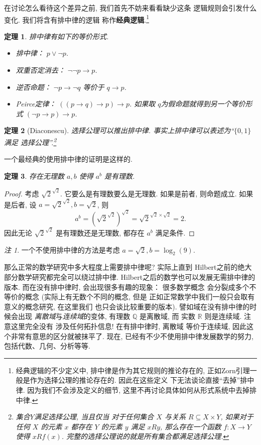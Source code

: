 \documentclass[UTF8]{ctexbook}
\theoremstyle{plain}
\newtheorem{theorem}{定理}[chapter]
\theoremstyle{definition}
\theoremstyle{remark}
\newtheorem*{remark}{注}
\begin{document}
在讨论怎么看待这个差异之前, 我们首先不妨来看看缺少这条
逻辑规则会引发什么变化. 我们将含有排中律的逻辑
称作\textbf{经典逻辑}.\footnote{经典逻辑的不少定义中,
排中律是作为其它规则的推论存在的,
正如Zorn引理一般是作为选择公理的推论存在的. 因此在这些定义
下无法谈论直接“去掉”排中律. 因为我们不会涉及定义的细节,
这里不再讨论具体如何从形式系统中去掉排中律.}
\begin{theorem}
排中律有如下的等价形式.
\begin{itemize}
\item 排中律： \(p \vee \neg p\).
\item 双重否定消去： \(\neg\neg p \to p\).
\item 逆否命题： \(\neg p \to \neg q\) 等价于 \(q \to p\).
\item Peirce定律： \(((p \to q) \to p) \to p\). 如果取 \(q\)为假命题就得到另一个等价形式 \((\neg p\to p) \to p\).
\end{itemize}
\end{theorem}
\begin{theorem}[Diaconescu]
选择公理可以推出排中律.
事实上排中律可以表述为“\(\{0,1\}\)满足
选择公理”.\footnote{集合\(Y\)满足选择公理, 当且仅当
对于任何集合 \(X\) 与关系 \(R \subseteq X \times Y\), 如果对于
任何 \(X\) 的元素 \(x\) 都存在 \(Y\) 的元素 \(y\)
满足 \(xRy\), 那么存在一个函数 \(f : X \to Y\) 使得
\(xRf(x)\). 完整的选择公理说的就是所有集合都满足选择公理.}
\end{theorem}

一个最经典的使用排中律的证明是这样的.
\begin{theorem}
存在无理数 \(a,b\) 使得 \(a^b\) 是有理数.
\end{theorem}
\begin{proof}
考虑 \({\sqrt2}^{\sqrt2}\). 它要么是有理数要么是无理数.
如果是前者, 则命题成立. 如果是后者, 设 \(a = {\sqrt2}^{\sqrt2},
b = \sqrt 2\), 则
\[a^b = ({\sqrt2}^{\sqrt2})^{\sqrt2} = {\sqrt2}^{\sqrt2\times\sqrt2} = 2.\]
因此无论 \({\sqrt2}^{\sqrt2}\) 是有理数还是无理数,
都存在 \(a^b\) 满足条件.
\end{proof}
\begin{remark}
一个不使用排中律的方法是考虑 \(a = \sqrt 2, b = \log_2(9).\)
\end{remark}

那么正常的数学研究中多大程度上需要排中律呢? 实际上直到
Hilbert之前的绝大部分数学研究都完全可以绕过排中律.
Hilbert之后的数学也可以发展无需排中律的版本.
而在没有排中律时, 会出现很多有趣的现象： 很多数学概念
会分裂成多个不等价的概念 (实际上有无数个不同的概念, 但是
正如正常数学中我们一般只会取有意义的概念研究, 在这里我们
也只会谈比较重要的版本). 譬如域在没有排中律的时候会出现%
\emph{离散域}与\emph{连续域}的变体, 有理数
\(\mathbb Q\) 是离散域, 而
实数 \(\mathbb R\) 则是连续域. 注意这里完全没有
涉及任何拓扑信息! 在有排中律时, 离散域
等价于连续域, 因此这个非常有意思的区分就被抹平了.
现在, 已经有不少不使用排中律发展数学的努力,
包括代数、几何、分析等等.
\end{document}
